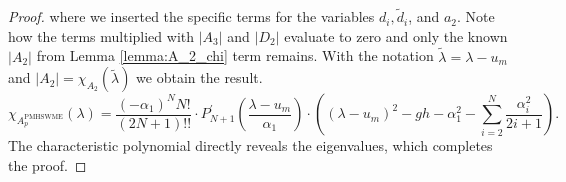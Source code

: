 \documentclass[10pt,a4paper]{amsart}
\begin{document}
\begin{proof}
    where we inserted the specific terms for the variables $d_i, \widetilde{d}_i$, and $a_2$. Note how the terms multiplied with $|A_3|$ and $|D_2|$ evaluate to zero and only the known $|A_2|$ from Lemma \ref{lemma:A_2_chi} term remains.
    With the notation $\widetilde{\lambda} = \lambda - u_m$ and $|A_2| = \chi_{A_2}(\widetilde{\lambda})$ we obtain the result.
    \begin{equation*}
        \chi_{A^{\textrm{PMHSWME}}_{p}}(\lambda) = \frac{(-\alpha_1)^NN!}{(2N+1)!!} \cdot P^{'}_{N+1}\left(\frac{\lambda-u_m}{\alpha_1}\right) \cdot \left( \left( \lambda - u_m \right)^2 - gh - \alpha_1^2 - \sum\limits_{i=2}^N\frac{\alpha_i^2}{2i+1}\right).
    \end{equation*}
    The characteristic polynomial directly reveals the eigenvalues, which completes the proof.
\end{proof}
\end{document}
